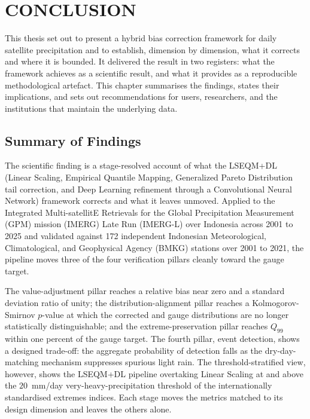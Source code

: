 %

\chapter{CONCLUSION}\label{chap:conclusion}

This thesis set out to present a hybrid bias correction framework
for daily satellite precipitation and to establish, dimension by
dimension, what it corrects and where it is bounded. It delivered
the result in two registers: what the framework achieves as a
scientific result, and what it provides as a reproducible
methodological artefact. This chapter summarises
the findings, states their implications, and sets out
recommendations for users, researchers, and the institutions that
maintain the underlying data.


\section{Summary of Findings}\label{sec:conclusion-summary}

The scientific finding is a stage-resolved account of what the
LSEQM+DL (Linear Scaling, Empirical Quantile Mapping, Generalized
Pareto Distribution tail correction, and Deep Learning refinement
through a Convolutional Neural Network) framework corrects and
what it leaves unmoved. Applied to the Integrated Multi-satellitE Retrievals for the
Global Precipitation Measurement (GPM) mission (IMERG) Late Run
(IMERG-L) over Indonesia across 2001 to 2025 and validated against
172 independent Indonesian Meteorological, Climatological, and
Geophysical Agency (BMKG) stations over 2001 to 2021, the pipeline moves three
of the four verification pillars cleanly toward the gauge target.

The value-adjustment
pillar reaches a relative bias near zero and a standard deviation
ratio of unity; the distribution-alignment pillar reaches a
Kolmogorov-Smirnov $p$-value at which the corrected and gauge
distributions are no longer statistically distinguishable; and
the extreme-preservation pillar reaches $Q_{99}$ within one
percent of the gauge target. The fourth pillar, event detection,
shows a designed trade-off: the aggregate probability of
detection falls as the dry-day-matching mechanism suppresses
spurious light rain. The threshold-stratified view, however, shows the
LSEQM+DL pipeline overtaking Linear Scaling at and above the
$20$~mm/day very-heavy-precipitation threshold of the
internationally standardised extremes indices.
Each stage moves the metrics matched to its design dimension and
leaves the others alone.

